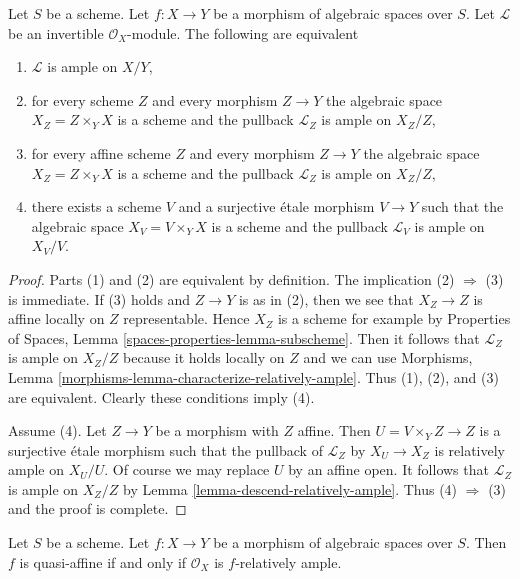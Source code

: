 \begin{lemma}
\label{lemma-relatively-ample-local}
Let $S$ be a scheme. Let $f : X \to Y$ be a morphism of algebraic spaces
over $S$. Let $\mathcal{L}$ be an invertible $\mathcal{O}_X$-module.
The following are equivalent
\begin{enumerate}
\item $\mathcal{L}$ is ample on $X/Y$,
\item for every scheme $Z$ and every morphism $Z \to Y$
the algebraic space $X_Z = Z \times_Y X$ is a scheme
and the pullback $\mathcal{L}_Z$ is ample on $X_Z/Z$,
\item for every affine scheme $Z$ and every morphism $Z \to Y$
the algebraic space $X_Z = Z \times_Y X$ is a scheme
and the pullback $\mathcal{L}_Z$ is ample on $X_Z/Z$,
\item there exists a scheme $V$ and a surjective \'etale morphism
$V \to Y$ such that the algebraic space $X_V = V \times_Y X$ is a scheme
and the pullback $\mathcal{L}_V$ is ample on $X_V/V$.
\end{enumerate}
\end{lemma}

\begin{proof}
Parts (1) and (2) are equivalent by definition.
The implication (2) $\Rightarrow$ (3) is immediate.
If (3) holds and $Z \to Y$ is as in (2), then we see
that $X_Z \to Z$ is affine locally on $Z$ representable.
Hence $X_Z$ is a scheme for example by
Properties of Spaces, Lemma \ref{spaces-properties-lemma-subscheme}.
Then it follows that $\mathcal{L}_Z$ is ample on $X_Z/Z$ because
it holds locally on $Z$ and we can use
Morphisms, Lemma \ref{morphisms-lemma-characterize-relatively-ample}.
Thus (1), (2), and (3) are equivalent. Clearly these conditions
imply (4).

\medskip\noindent
Assume (4). Let $Z \to Y$ be a morphism with $Z$ affine.
Then $U = V \times_Y Z \to Z$ is a surjective \'etale morphism
such that the pullback of $\mathcal{L}_Z$ by $X_U \to X_Z$
is relatively ample on $X_U/U$.
Of course we may replace $U$ by an affine open.
It follows that $\mathcal{L}_Z$ is ample on $X_Z/Z$ by
Lemma \ref{lemma-descend-relatively-ample}.
Thus (4) $\Rightarrow$ (3) and the proof is complete.
\end{proof}

\begin{lemma}
\label{lemma-quasi-affine-O-ample}
Let $S$ be a scheme. Let $f : X \to Y$ be a morphism of algebraic spaces
over $S$. Then $f$ is quasi-affine if and only if $\mathcal{O}_X$
is $f$-relatively ample.
\end{lemma}

